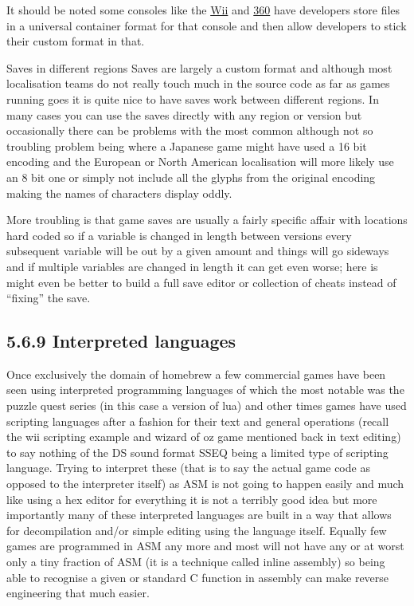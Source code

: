 \documentclass[
]{book}
\begin{document}
It should be noted some consoles like the \href{http://wiibrew.org/wiki/Savegame_Files}{Wii} and \href{http://free60.org/STFS}{360} have developers store files in a universal container format for that console and then allow developers to stick their custom format in that.

Saves in different regions Saves are largely a custom format and although most localisation teams do not really touch much in the source code as far as games running goes it is quite nice to have saves work between different regions. In many cases you can use the saves directly with any region or version but occasionally there can be problems with the most common although not so troubling problem being where a Japanese game might have used a 16 bit encoding and the European or North American localisation will more likely use an 8 bit one or simply not include all the glyphs from the original encoding making the names of characters display oddly.

More troubling is that game saves are usually a fairly specific affair with locations hard coded so if a variable is changed in length between versions every subsequent variable will be out by a given amount and things will go sideways and if multiple variables are changed in length it can get even worse; here is might even be better to build a full save editor or collection of cheats instead of ``fixing'' the save.

\hypertarget{interpreted-languages}{%
\subsection{5.6.9 Interpreted languages}\label{interpreted-languages}}

Once exclusively the domain of homebrew a few commercial games have been seen using interpreted programming languages of which the most notable was the puzzle quest series (in this case a version of lua) and other times games have used scripting languages after a fashion for their text and general operations (recall the wii scripting example and wizard of oz game mentioned back in text editing) to say nothing of the DS sound format SSEQ being a limited type of scripting language. Trying to interpret these (that is to say the actual game code as opposed to the interpreter itself) as ASM is not going to happen easily and much like using a hex editor for everything it is not a terribly good idea but more importantly many of these interpreted languages are built in a way that allows for decompilation and/or simple editing using the language itself. Equally few games are programmed in ASM any more and most will not have any or at worst only a tiny fraction of ASM (it is a technique called inline assembly) so being able to recognise a given or standard C function in assembly can make reverse engineering that much easier.
\end{document}
